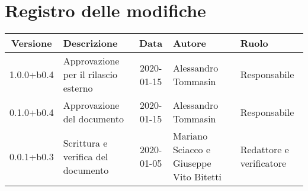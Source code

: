 \section*{Registro delle modifiche}

\begin{center}
	\begin{longtable}{|c|p{3.5cm}|c|p{3cm}|p{3cm}|}
	\hline
	\rowcolor{lighter-grayer}
	\textbf{Versione} & \textbf{Descrizione} & \textbf{Data} & \textbf{Autore} & \textbf{Ruolo} \\
	\hline
	\endfirsthead


	1.0.0+b0.4 & Approvazione per il rilascio esterno & 2020-01-15 & Alessandro Tommasin & Responsabile \\
	\hline
	0.1.0+b0.4 & Approvazione del documento & 2020-01-15 & Alessandro Tommasin & Responsabile \\
	\hline
	0.0.1+b0.3 & Scrittura e verifica del documento & 2020-01-05 & Mariano Sciacco e Giuseppe Vito Bitetti & Redattore e verificatore \\
	\hline

	\end{longtable}
\end{center}